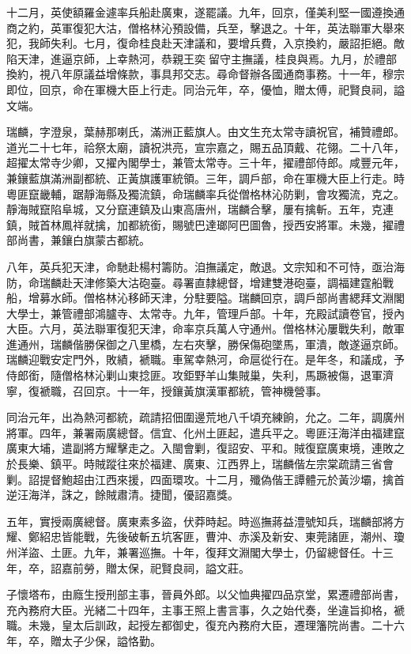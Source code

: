 \begin{pinyinscope}
十二月，英使額羅金遽率兵船赴廣東，遂罷議。九年，回京，僅美利堅一國遵換通商之約，英軍復犯大沽，僧格林沁預設備，兵至，擊退之。十年，英法聯軍大舉來犯，我師失利。七月，復命桂良赴天津議和，要增兵費，入京換約，嚴詔拒絕。敵陷天津，進逼京師，上幸熱河，恭親王奕留守主撫議，桂良與焉。九月，於禮部換約，視八年原議益增條款，事具邦交志。尋命督辦各國通商事務。十一年，穆宗即位，回京，命在軍機大臣上行走。同治元年，卒，優恤，贈太傅，祀賢良祠，謚文端。

瑞麟，字澄泉，葉赫那喇氏，滿洲正藍旗人。由文生充太常寺讀祝官，補贊禮郎。道光二十七年，祫祭太廟，讀祝洪亮，宣宗嘉之，賜五品頂戴、花翎。二十八年，超擢太常寺少卿，又擢內閣學士，兼管太常寺。三十年，擢禮部侍郎。咸豐元年，兼鑲藍旗滿洲副都統、正黃旗護軍統領。三年，調戶部，命在軍機大臣上行走。時粵匪竄畿輔，踞靜海縣及獨流鎮，命瑞麟率兵從僧格林沁防剿，會攻獨流，克之。靜海賊竄陷阜城，又分竄連鎮及山東高唐州，瑞麟合擊，屢有擒斬。五年，克連鎮，賊首林鳳祥就擒，加都統銜，賜號巴達瑯阿巴圖魯，授西安將軍。未幾，擢禮部尚書，兼鑲白旗蒙古都統。

八年，英兵犯天津，命馳赴楊村籌防。洎撫議定，敵退。文宗知和不可恃，亟治海防，命瑞麟赴天津修築大沽砲臺。尋署直隸總督，增建雙港砲臺，調福建霆船戰船，增募水師。僧格林沁移師天津，分駐要隘。瑞麟回京，調戶部尚書緦拜文淵閣大學士，兼管禮部鴻臚寺、太常寺。九年，管理戶部。十年，充殿試讀卷官，授內大臣。六月，英法聯軍復犯天津，命率京兵萬人守通州。僧格林沁屢戰失利，敵軍進通州，瑞麟偕勝保御之八里橋，左右夾擊，勝保傷砲墜馬，軍潰，敵遂逼京師。瑞麟迎戰安定門外，敗績，褫職。車駕幸熱河，命扈從行在。是年冬，和議成，予侍郎銜，隨僧格林沁剿山東捻匪。攻鉅野羊山集賊巢，失利，馬蹶被傷，退軍濟寧，復褫職，召回京。十一年，授鑲黃旗漢軍都統，管神機營事。

同治元年，出為熱河都統，疏請招佃圍邊荒地八千頃充練餉，允之。二年，調廣州將軍。四年，兼署兩廣總督。信宜、化州土匪起，遣兵平之。粵匪汪海洋由福建竄廣東大埔，遣副將方耀擊走之。入閩會剿，復詔安、平和。賊復竄廣東境，連敗之於長樂、鎮平。時賊蹤往來於福建、廣東、江西界上，瑞麟偕左宗棠疏請三省會剿。詔提督鮑超由江西來援，四面環攻。十二月，殲偽偕王譚體元於黃沙壩，擒首逆汪海洋，誅之，餘賊肅清。捷聞，優詔嘉獎。

五年，實授兩廣總督。廣東素多盜，伏莽時起。時巡撫蔣益澧號知兵，瑞麟部將方耀、鄭紹忠皆能戰，先後破斬五坑客匪，曹沖、赤溪及新安、東莞諸匪，潮州、瓊州洋盜、土匪。九年，兼署巡撫。十年，復拜文淵閣大學士，仍留總督任。十三年，卒，詔嘉前勞，贈太保，祀賢良祠，謚文莊。

子懷塔布，由廕生授刑部主事，晉員外郎。以父恤典擢四品京堂，累遷禮部尚書，充內務府大臣。光緒二十四年，主事王照上書言事，久之始代奏，坐違旨抑格，褫職。未幾，皇太后訓政，起授左都御史，復充內務府大臣，遷理籓院尚書。二十六年，卒，贈太子少保，謚恪勤。


\end{pinyinscope}
